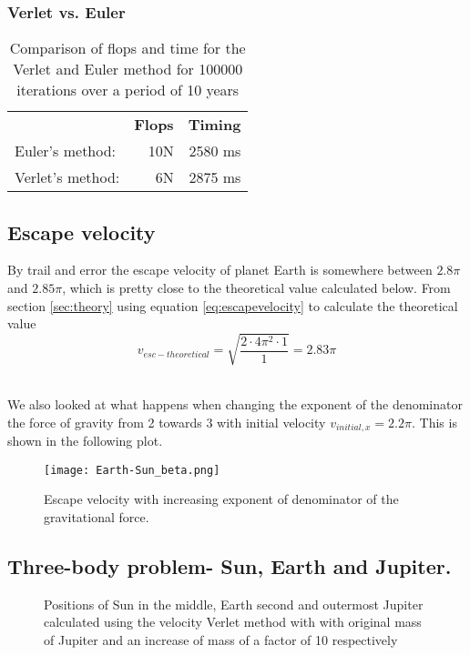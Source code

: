 \documentclass[../main.tex]{subfiles}
\begin{document}
\subsubsection{Verlet vs. Euler}\label{sec:Verlet_VS_Euler}
\begin{table}[!h]
  \caption{Comparison of flops and time for the Verlet and Euler method for 100000 iterations over a period of 10 years}
  \centering
  \begin{tabular}{l r r}
                            &\textbf{Flops}&\textbf{Timing}\\
    Euler's method:          &10N&2580 ms\\
    Verlet's method:          &6N&2875 ms\\
  \end{tabular}
  \label{tab:EulervsVerlet}
  \end{table}
\FloatBarrier

\subsection{Escape velocity}
By trail and error the escape velocity of planet Earth is somewhere between $2.8 \pi$ and $2.85 \pi$, which is pretty close to the theoretical value calculated below.
From section \ref{sec:theory} using equation \ref{eq:escapevelocity} to calculate the  theoretical value $$v_{esc-theoretical} = \sqrt{\frac{2\cdot4\pi^2\cdot1}{1}} = 2.83 \pi$$\

We also looked at what happens when changing the exponent of the denominator the force of gravity from 2 towards 3 with initial velocity $v_{initial,x} = 2.2\pi$. This is shown in the following plot.

\begin{figure}[h!]
  \centering
  \texttt{[image: Earth-Sun\_beta.png]}
  \caption{Escape velocity with increasing exponent of denominator of the gravitational force.}
  \label{fig:v_esc_beta}
\end{figure}

\subsection{Three-body problem- Sun, Earth and Jupiter.}
\begin{figure}[!h]
  \centering
  \caption{Positions of Sun in the middle, Earth second and outermost Jupiter calculated using the velocity Verlet method with with original mass of Jupiter and an increase of mass of a factor of 10 respectively}
  \label{fig:SunEarthJupiter10}
\end{figure}
\end{document}
